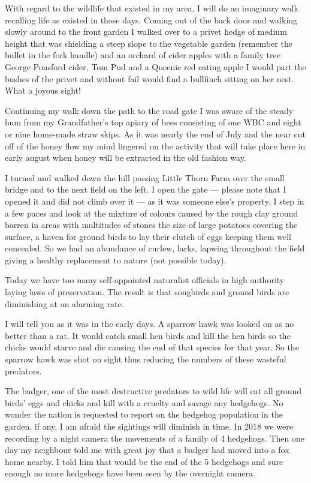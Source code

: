 With regard to the wildlife that existed in my area, I will do an imaginary walk
recalling life as existed in those days. Coming out of the back door and
walking slowly around to the front garden I walked over to a privet hedge of
medium height that was shielding a steep slope to the vegetable garden
(remember the bullet in the fork handle) and an orchard of cider apples with a
family tree George Ponsford cider, Tom Pud and a Queenie red eating apple I
would part the bushes of the privet and without fail would find a bullfinch
sitting on her nest. What a joyous sight!

Continuing my walk down the path to the road gate I was aware of the steady hum
from my Grandfather's top apiary of bees consisting of one WBC and eight or
nine home-made straw skips. As it was nearly the end of July and the near cut
off of the honey flow my mind lingered on the activity that will take place
here in early august when honey will be extracted in the old fashion way.

I turned and walked down the hill passing Little Thorn Farm over the small
bridge and to the next field on the left. I open the gate --- please note that I
opened it and did not climb over it --- as it was someone else's property. I
step in a few paces and look at the mixture of colours caused by the rough clay
ground barren in areas with multitudes of stones the size of large potatoes
covering the surface, a haven for ground birds to lay their clutch of eggs
keeping them well concealed. So we had an abundance of curlew, larks, lapwing
throughout the field giving a healthy replacement to nature (not possible
today).

Today we have too many self-appointed naturalist officials in high authority
laying laws of preservation. The result is that songbirds and ground birds are
diminishing at an alarming rate.

I will tell you as it was in the early days. A sparrow hawk was looked on as no
better than a rat. It would catch small hen birds and kill the hen birds so
the chicks would starve and die causing the end of that species for that year.
So the sparrow hawk was shot on sight thus reducing the numbers of these
wasteful predators.



The badger, one of the most destructive predators to wild life will eat all
ground birds' eggs and chicks and kill with a cruelty and savage any hedgehogs.
No wonder the nation is requested to report on the hedgehog population in the
garden, if any. I am afraid the sightings will diminish in time. In 2018 we
were recording by a night camera the movements of a family of 4 hedgehogs. Then
one day my neighbour told me with great joy that a badger had moved into a fox
home nearby. I told him that would be the end of the 5 hedgehogs and sure
enough no more hedgehogs have been seen by the overnight camera.

